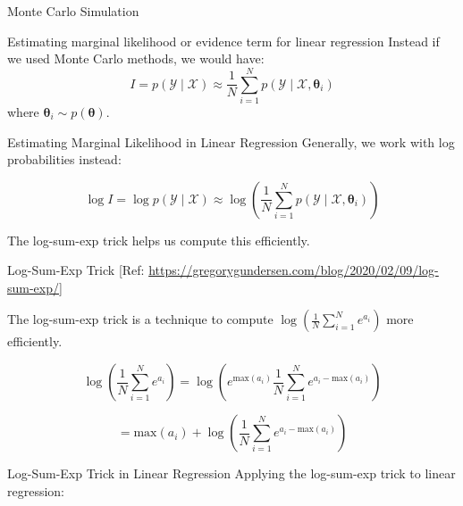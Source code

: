 \documentclass{beamer}
\begin{document}
\begin{section}{Monte Carlo Simulation}
    \begin{frame}{Estimating marginal likelihood or evidence term for linear regression}
        Instead if we used Monte Carlo methods, we would have:
        \pause \begin{equation}
            I = p(\mathcal{Y} \mid \mathcal{X}) \approx \frac{1}{N} \sum_{i=1}^{N} p(\mathcal{Y} \mid \mathcal{X}, \boldsymbol{\theta}_i)
        \end{equation}
        where $\boldsymbol{\theta}_i \sim p(\boldsymbol{\theta})$.
    \end{frame}
        
        \begin{frame}{Estimating Marginal Likelihood in Linear Regression}
            Generally, we work with log probabilities instead:
            
            \begin{equation}
                \log I = \log p(\mathcal{Y} \mid \mathcal{X}) \approx \log\left(\frac{1}{N} \sum_{i=1}^{N} p(\mathcal{Y} \mid \mathcal{X}, \boldsymbol{\theta}_i)\right)
            \end{equation}
            
            The log-sum-exp trick helps us compute this efficiently.
        \end{frame}
        

        \begin{frame}{Log-Sum-Exp Trick}
            [Ref: \url{https://gregorygundersen.com/blog/2020/02/09/log-sum-exp/}]

            The log-sum-exp trick is a technique to compute $\log\left(\frac{1}{N} \sum_{i=1}^{N} e^{a_i}\right)$ more efficiently.
            
            \begin{equation}
                \log\left(\frac{1}{N} \sum_{i=1}^{N} e^{a_i}\right) = \log\left(e^{\text{max}(a_i)} \frac{1}{N} \sum_{i=1}^{N} e^{a_i - \text{max}(a_i)}\right)
            \end{equation}
            
            \pause
            \begin{equation}
                = \text{max}(a_i) + \log\left(\frac{1}{N} \sum_{i=1}^{N} e^{a_i - \text{max}(a_i)}\right)
            \end{equation}
        \end{frame}
        
        \begin{frame}{Log-Sum-Exp Trick in Linear Regression}
            Applying the log-sum-exp trick to linear regression:
            

\end{frame}
\end{section}
\end{document}
